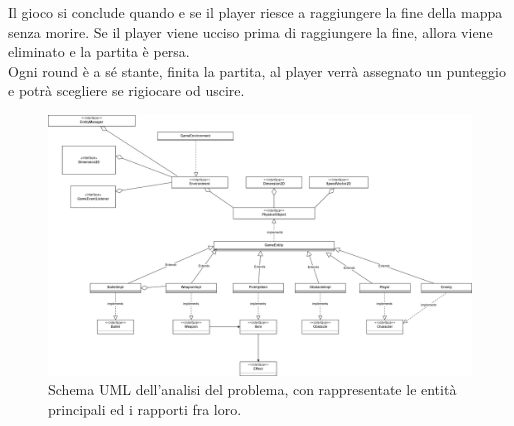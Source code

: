 \textsf{\small Il gioco si conclude quando e se il player riesce a raggiungere la fine della mappa senza morire.}
\textsf{\small Se il player viene ucciso prima di raggiungere la fine, allora viene eliminato e la partita è persa.}\\

\textsf{\small Ogni round è a sé stante, finita la partita, al player verrà assegnato un punteggio e potrà scegliere se rigiocare od uscire.}\\


	\begin{figure}[h]
		\centering{}
		\includegraphics[width=1.2\linewidth]{./img/model.png}
		\caption{Schema UML dell'analisi del problema, con rappresentate le entità principali ed i rapporti fra loro.}
		\label{img:analysis}
	\end{figure}

